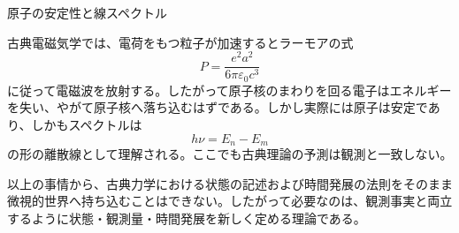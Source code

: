 \begin{experimentalfact}{原子の安定性と線スペクトル}
\end{experimentalfact}

古典電磁気学では、電荷をもつ粒子が加速するとラーモアの式
\[
P=\frac{e^2 a^2}{6\pi\varepsilon_0 c^3}
\]
に従って電磁波を放射する。したがって原子核のまわりを回る電子はエネルギーを失い、やがて原子核へ落ち込むはずである。しかし実際には原子は安定であり、しかもスペクトルは
\[
h\nu = E_n-E_m
\]
の形の離散線として理解される。ここでも古典理論の予測は観測と一致しない。

以上の事情から、古典力学における状態の記述および時間発展の法則をそのまま微視的世界へ持ち込むことはできない。したがって必要なのは、観測事実と両立するように状態・観測量・時間発展を新しく定める理論である。
